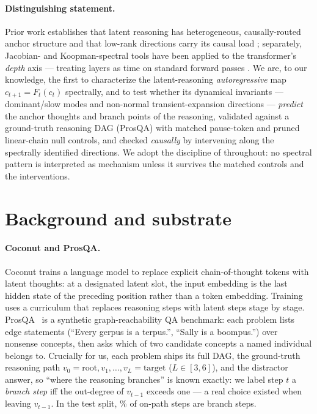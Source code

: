 \documentclass[11pt]{article}
\newcommand{\cthought}[1]{c_{#1}}
\newcommand{\prosqa}{ProsQA}
\begin{document}
\paragraph{Distinguishing statement.} Prior work establishes that latent reasoning has
heterogeneous, causally-routed anchor structure \citep{li2026dynamics} and that low-rank
directions carry its causal load \citep{aswal2026observable}; separately, Jacobian- and
Koopman-spectral tools have been applied to the transformer's \emph{depth} axis ---
treating layers as time on standard forward passes \citep{fernando2026dynamics,
kim2026rksp}. We are, to our knowledge, the first to characterize the latent-reasoning
\emph{autoregressive} map $\cthought{t+1}=F_t(\cthought{t})$ spectrally, and to test
whether its dynamical invariants --- dominant/slow modes and non-normal
transient-expansion directions --- \emph{predict} the anchor thoughts and branch points
of the reasoning, validated against a ground-truth reasoning DAG (\prosqa) with matched
pause-token and pruned linear-chain null controls, and checked \emph{causally} by
intervening along the spectrally identified directions. We adopt the discipline of
\citet{aswal2026observable} throughout: no spectral pattern is interpreted as mechanism
unless it survives the matched controls and the interventions.

\section{Background and substrate}
\label{sec:substrate}

\paragraph{Coconut and \prosqa.} Coconut \citep{hao2024coconut} trains a language model
to replace explicit chain-of-thought tokens with latent thoughts: at a designated latent
slot, the input embedding is the last hidden state of the preceding position rather than
a token embedding. Training uses a curriculum that replaces reasoning steps with latent
steps stage by stage. \prosqa\ \citep{hao2024coconut} is a synthetic graph-reachability
QA benchmark: each problem lists edge statements (``Every gerpus is a terpus.'',
``Sally is a boompus.'') over nonsense concepts, then asks which of two candidate
concepts a named individual belongs to. Crucially for us, each problem ships its full
DAG, the ground-truth reasoning path $v_0=\text{root},v_1,\dots,v_L=\text{target}$
($L\in[3,6]$), and the distractor answer, so ``where the reasoning branches'' is known
exactly: we label step $t$ a \emph{branch step} iff the out-degree of $v_{t-1}$ exceeds
one --- a real choice existed when leaving $v_{t-1}$. In the test split,
\branchRatePct\% of on-path steps are branch steps.
\end{document}
